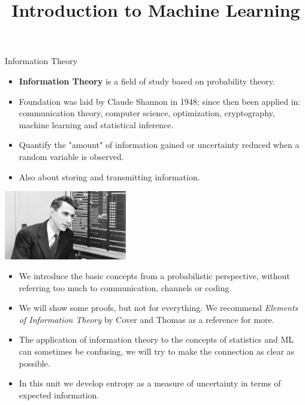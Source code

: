 \documentclass[11pt,compress,t,notes=noshow, xcolor=table]{beamer}
\title{Introduction to Machine Learning}
\date{}
\begin{document}


\begin{vbframe}{Information Theory}

\begin{itemize}
  \item \textbf{Information Theory} is a field of study based on probability theory.
  \item Foundation was laid by Claude Shannon in 1948; since then been applied in: communication theory, computer science, optimization, cryptography, machine learning and statistical inference.

  \item Quantify the "amount" of information gained or 
    uncertainty reduced when a random variable is observed.

  \item Also about storing and transmitting information.
\end{itemize}

  \begin{center}
\includegraphics[width = 0.4\textwidth]{figure_man/claude-shannon.jpg} \\
\end{center}

\framebreak

\lz
\begin{itemize}
\setlength\itemsep{1.2em}
  \item We introduce the basic concepts from a probabilistic perspective, without referring too much to communication, channels or coding.
  \item We will show some proofs, but not for everything. We recommend 
    \textit{Elements of Information Theory} by Cover and Thomas as a reference for more. 
  \item The application of information theory to the concepts of statistics and ML can sometimes be confusing, we will try to make the connection as clear as possible.
  \item In this unit we develop entropy as a measure of uncertainty in terms of expected information.
\end{itemize}
\end{vbframe}
\end{document}
